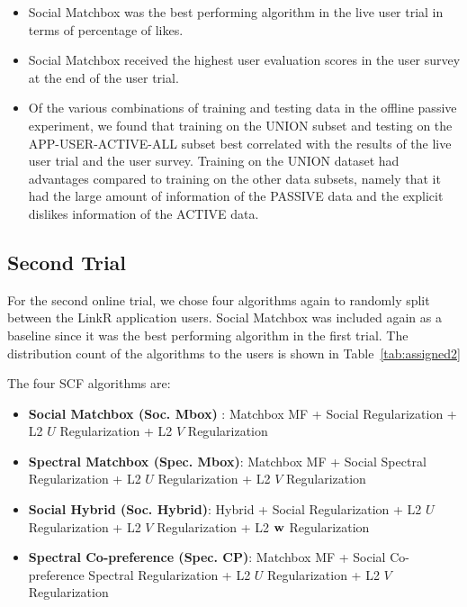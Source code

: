 \begin{itemize}
\item{Social Matchbox was the best performing algorithm in the live user trial in terms of percentage of likes.}

\item{Social Matchbox received the highest user evaluation scores in the user survey at the end of the user trial.}

\item{Of the various combinations of training and testing data in the offline passive experiment, we found that training on the UNION subset and testing on the APP-USER-ACTIVE-ALL subset best correlated with the results of the live user trial and the user survey. Training on the UNION dataset had advantages compared to training on the other data subsets, namely that it had the large amount of information of the PASSIVE data and the explicit dislikes information of the ACTIVE data.}

\end{itemize}


\subsection{Second Trial}

For the second online trial, we chose four algorithms again to
randomly split between the LinkR application users. Social Matchbox
was included again as a baseline since it was the best performing
algorithm in the first trial. The distribution count of the algorithms
to the users is shown in Table~\ref{tab:assigned2}

The four SCF algorithms are:

\begin{itemize}
\item{{\bf Social Matchbox (Soc. Mbox)} : Matchbox MF + Social Regularization +  L2 $U$ Regularization + L2 $V$ Regularization}
\item{{\bf Spectral Matchbox (Spec. Mbox)}: Matchbox MF + Social Spectral Regularization + L2 $U$ Regularization + L2 $V$ Regularization}
\item{{\bf Social Hybrid (Soc. Hybrid)}: Hybrid + Social Regularization + L2 $U$ Regularization + L2 $V$ Regularization + L2 $\mathbf{w}$ Regularization}
\item{{\bf Spectral Co-preference (Spec. CP)}: Matchbox MF + Social Co-preference Spectral Regularization + L2 $U$ Regularization + L2 $V$ Regularization}
\end{itemize}

